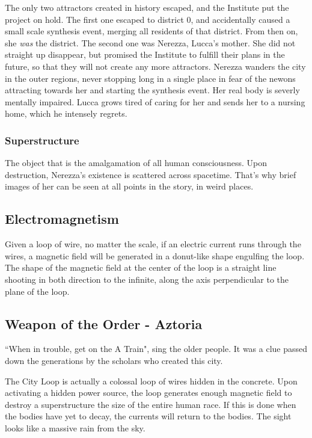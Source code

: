 \documentclass[11pt]{article}
\begin{document}
		The only two attractors created in history escaped, and the Institute put the project on hold. 
		The first one escaped to district 0, and accidentally caused a small scale synthesis event, merging all residents of that district. 
		From then on, she \textit{was} the district.
		The second one was Nerezza, Lucca's mother. She did not straight up disappear, but promised the Institute to fulfill their plans in the future, so that they will not create any more attractors. 
		Nerezza wanders the city in the outer regions, never stopping long in a single place in fear of the newons attracting towards her and starting the synthesis event. 
		Her real body is severly mentally impaired. 
		Lucca grows tired of caring for her and sends her to a nursing home, which he intensely regrets.
		\subsubsection{Superstructure}
		The object that is the amalgamation of all human consciousness. Upon destruction, Nerezza's existence is scattered across spacetime. That's why brief images of her can be seen at all points in the story, in weird places.
		\newpage
	
	\subsection{Electromagnetism}
	Given a loop of wire, no matter the scale, if an electric current runs through the wires, a magnetic field will be generated in a donut-like shape engulfing the loop. 
	The shape of the magnetic field at the center of the loop is a straight line shooting in both direction to the infinite, along the axis perpendicular to the plane of the loop.
	
	\subsection{Weapon of the Order - Aztoria}
	``When in trouble, get on the A Train", sing the older people. 
	It was a clue passed down the generations by the scholars who created this city. 
	
	The City Loop is actually a colossal loop of wires hidden in the concrete. 
	Upon activating a hidden power source, the loop generates enough magnetic field to destroy a superstructure the size of the entire human race. 
	If this is done when the bodies have yet to decay, the currents will return to the bodies. The sight looks like a massive rain from the sky.
	
\end{document}

